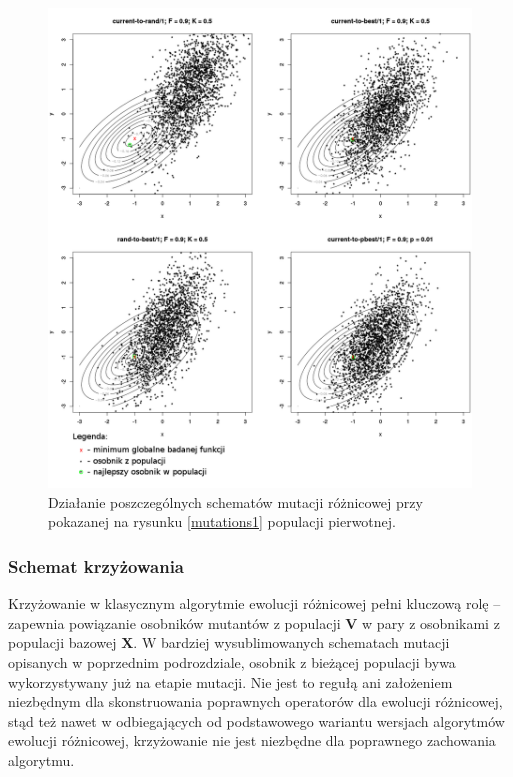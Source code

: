 \documentclass[12pt,a4paper]{report}
\begin{document}
{{{{\begin{description}
\begin{figure}[h]
\begin{center}\includegraphics[scale=0.375]{img/mutations2.png}\end{center}
\caption{Działanie poszczególnych schematów mutacji różnicowej przy pokazanej na rysunku \ref{mutations1} populacji pierwotnej.}
\label{mutations2}
\end{figure}

\end{description}
}
\subsubsection{Schemat krzyżowania}
\par{
Krzyżowanie w klasycznym algorytmie ewolucji różnicowej pełni kluczową rolę -- zapewnia powiązanie osobników mutantów z populacji $\mathbf{V}$ w pary z osobnikami z populacji bazowej $\mathbf{X}$. W bardziej wysublimowanych schematach mutacji opisanych w poprzednim podrozdziale, osobnik z bieżącej populacji bywa wykorzystywany już na etapie mutacji. Nie jest to regułą ani założeniem niezbędnym dla skonstruowania poprawnych operatorów dla ewolucji różnicowej, stąd też nawet w odbiegających od podstawowego wariantu wersjach algorytmów ewolucji różnicowej, krzyżowanie nie jest niezbędne dla poprawnego zachowania algorytmu.
}

}}}
\end{document}
